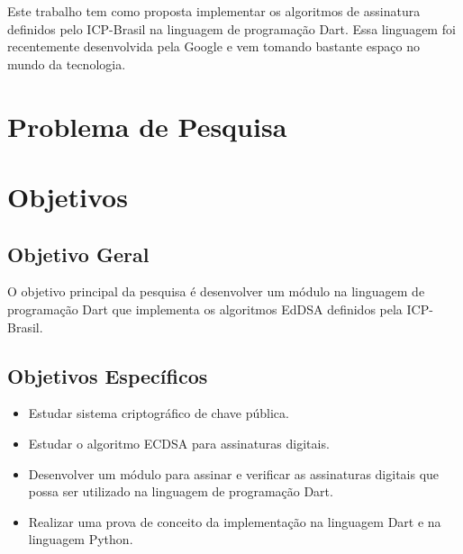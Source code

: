 Este trabalho tem como proposta implementar os algoritmos de assinatura definidos pelo ICP-Brasil na linguagem de programação Dart. Essa linguagem foi recentemente desenvolvida pela Google e vem tomando bastante espaço no mundo da tecnologia. 

\section{Problema de Pesquisa}

\section{Objetivos}

\subsection{Objetivo Geral}

O objetivo principal da pesquisa é desenvolver um módulo na linguagem de programação Dart que implementa os algoritmos EdDSA definidos pela ICP-Brasil.

\subsection{Objetivos Específicos}

\begin{itemize}
    \item Estudar sistema criptográfico de chave pública.
    \item Estudar o algoritmo ECDSA para assinaturas digitais.
    \item Desenvolver um módulo para assinar e verificar as assinaturas digitais que possa ser utilizado na linguagem de programação Dart.
    \item Realizar uma prova de conceito da implementação na linguagem Dart e na linguagem Python. 
\end{itemize}
    